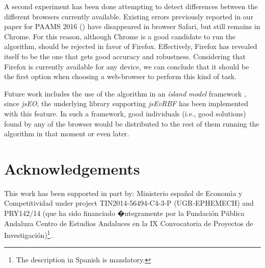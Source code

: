 \documentclass{article}
\begin{document}
A second experiment has been done attempting to detect differences between the different browsers currently available. Existing errors previously reported in our paper for PAAMS 2016 (\cite{DBLP:conf/dcai/RivasPMAG16}) have disappeared in browser Safari, but still remains in Chrome. For this reason, although Chrome is a good candidate to run the algorithm, should be rejected in favor of Firefox. Effectively, Firefox has revealed itself to be the one that gets good accuracy and robustness. Considering that Firefox is currently available for any device, we can conclude that it should be the first option when choosing a web-browser to perform this kind of task.

Future work includes the use of the algorithm in an {\em island model}  framework , since {\em jsEO}, the underlying
library supporting {\em jsEvRBF} has been implemented with this
feature. In such a framework, good
individuals (i.e., good solutions) found by any of the browser would be distributed to the rest of them running the algorithm in that moment or even later.


\section*{Acknowledgements}
 This work has been supported in part by:
 Ministerio espa\~{n}ol de Econom\'{\i}a y Competitividad under project TIN2014-56494-C4-3-P (UGR-EPHEMECH)
 and
 PRY142/14 (que ha sido financiado �ntegramente por la Fundaci\'{o}n P\'{u}blica Andaluza Centro de Estudios Andaluces en la IX Convocatoria de Proyectos de Investigaci\'{o}n)\footnote{The description in Spanish is mandatory.}.

%
%





\newpage
\clearpage
\end{document}
